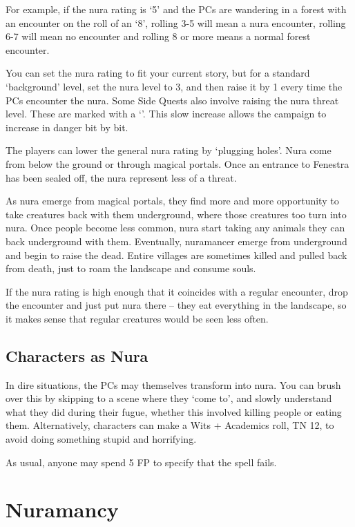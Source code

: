 \begin{multicols}{2}
For example, if the nura rating is `5' and the PCs are wandering in a forest with an encounter on the roll of an `8', rolling 3-5 will mean a nura encounter, rolling 6-7 will mean no encounter and rolling 8 or more means a normal forest encounter.

You can set the nura rating to fit your current story, but for a standard `background' level, set the nura level to 3, and then raise it by 1 every time the PCs encounter the nura.
Some Side Quests also involve raising the nura threat level.  These are marked with a `\N'.
This slow increase allows the campaign to increase in danger bit by bit.

The players can lower the general nura rating by `plugging holes'.
Nura come from below the ground or through magical portals.
Once an entrance to Fenestra has been sealed off, the nura represent less of a threat.

As nura emerge from magical portals, they find more and more opportunity to take creatures back with them underground, where those creatures too turn into nura.
Once people become less common, nura start taking any animals they can back underground with them.
Eventually, nuramancer emerge from underground and begin to raise the dead.
Entire villages are sometimes killed and pulled back from death, just to roam the landscape and consume souls.

If the nura rating is high enough that it coincides with a regular encounter, drop the encounter and just put nura there -- they eat everything in the landscape, so it makes sense that regular creatures would be seen less often.

\subsection{Characters as Nura}

In dire situations, the PCs may themselves transform into nura.
You can brush over this by skipping to a scene where they `come to', and slowly understand what they did during their fugue, whether this involved killing people or eating them.
Alternatively, characters can make a Wits + Academics roll, TN 12, to avoid doing something stupid and horrifying.

As usual, anyone may spend 5 FP to specify that the spell fails.

\end{multicols}

\section{Nuramancy}

